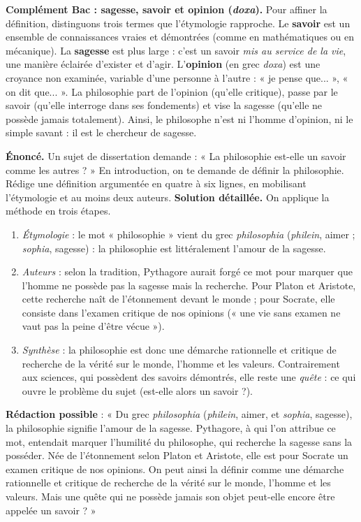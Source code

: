 \documentclass[11pt]{article}
\begin{document}
\textbf{Complément Bac : sagesse, savoir et opinion (\emph{doxa}).} Pour affiner la définition, distinguons trois termes que l'étymologie rapproche. Le \textbf{savoir} est un ensemble de connaissances vraies et démontrées (comme en mathématiques ou en mécanique). La \textbf{sagesse} est plus large : c'est un savoir \emph{mis au service de la vie}, une manière éclairée d'exister et d'agir. L'\textbf{opinion} (en grec \emph{doxa}) est une croyance non examinée, variable d'une personne à l'autre : « je pense que... », « on dit que... ». La philosophie part de l'opinion (qu'elle critique), passe par le savoir (qu'elle interroge dans ses fondements) et vise la sagesse (qu'elle ne possède jamais totalement). Ainsi, le philosophe n'est ni l'homme d'opinion, ni le simple savant : il est le chercheur de sagesse.

\begin{exoresolu}
\textbf{Énoncé.} Un sujet de dissertation demande : « La philosophie est-elle un savoir comme les autres ? » En introduction, on te demande de définir la philosophie. Rédige une définition argumentée en quatre à six lignes, en mobilisant l'étymologie et au moins deux auteurs.
\tcblower
\textbf{Solution détaillée.} On applique la méthode en trois étapes.
\begin{enumerate}
\item \emph{Étymologie} : le mot « philosophie » vient du grec \emph{philosophia} (\emph{philein}, aimer ; \emph{sophia}, sagesse) : la philosophie est littéralement l'amour de la sagesse.
\item \emph{Auteurs} : selon la tradition, Pythagore aurait forgé ce mot pour marquer que l'homme ne possède pas la sagesse mais la recherche. Pour Platon et Aristote, cette recherche naît de l'étonnement devant le monde ; pour Socrate, elle consiste dans l'examen critique de nos opinions (« une vie sans examen ne vaut pas la peine d'être vécue »).
\item \emph{Synthèse} : la philosophie est donc une démarche rationnelle et critique de recherche de la vérité sur le monde, l'homme et les valeurs. Contrairement aux sciences, qui possèdent des savoirs démontrés, elle reste une \emph{quête} : ce qui ouvre le problème du sujet (est-elle alors un savoir ?).
\end{enumerate}
\textbf{Rédaction possible} : « Du grec \emph{philosophia} (\emph{philein}, aimer, et \emph{sophia}, sagesse), la philosophie signifie l'amour de la sagesse. Pythagore, à qui l'on attribue ce mot, entendait marquer l'humilité du philosophe, qui recherche la sagesse sans la posséder. Née de l'étonnement selon Platon et Aristote, elle est pour Socrate un examen critique de nos opinions. On peut ainsi la définir comme une démarche rationnelle et critique de recherche de la vérité sur le monde, l'homme et les valeurs. Mais une quête qui ne possède jamais son objet peut-elle encore être appelée un savoir ? »
\end{exoresolu}
\end{document}
